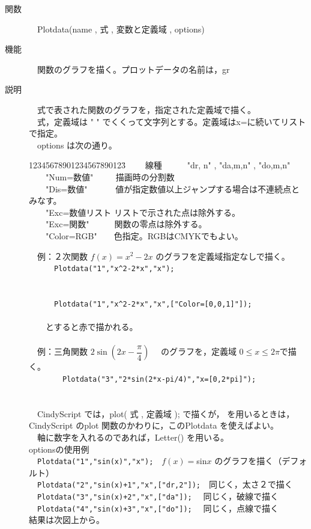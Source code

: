 \documentclass[papersize,a4paper,12pt,uplatex]{jsarticle}
\begin{document}
\begin{description}
\hypertarget{plotdata}{}
\item[関数]　Plotdata(name , 式 , 変数と定義域 , options)
\item[機能]　関数のグラフを描く。プロットデータの名前は，gr
\item[説明]　式で表された関数のグラフを，指定された定義域で描く。\\
　式，定義域は " " でくくって文字列とする。定義域はx=に続いてリストで指定。\\
　options は次の通り。
\begin{tabbing}
12345678901234567890123\=\kill
　　線種　　　\>"dr, n"  , "da,m,n" , "do,m,n"\\
　　"Num=数値" 　　 \>描画時の分割数\\
　　"Dis=数値"　　　 \>値が指定数値以上ジャンプする場合は不連続点とみなす。\\
　　"Exc=数値リスト \>リストで示された点は除外する。\\
　　"Exc=関数"　　　\>関数の零点は除外する。\\
　　"Color=RGB"　　\>色指定。RGBはCMYKでもよい。\\
\end{tabbing}
　例：２次関数 $f(x)=x^2-2x$ のグラフを定義域指定なしで描く。\\
　　　\verb|Plotdata("1","x^2-2*x","x");|\\
　\\
　　
　\\
　　　\verb|Plotdata("1","x^2-2*x","x",["Color=[0,0,1]"]);|\\
　\\
　　とすると赤で描かれる。\\
　\\
　例：三角関数 $2\sin \left(2x-\dfrac{\pi}{4} \right)$ 　のグラフを，定義域 $0 \leq x \leq 2 \pi$で描く。\\
　　　　\verb|Plotdata("3","2*sin(2*x-pi/4)","x=[0,2*pi]");|\\
　\\
　　　　
　\\
　CindyScript では，plot( 式 , 定義域 ); で描くが， \ketcindy  を用いるときは，CindyScript のplot 関数のかわりに，このPlotdata を使えばよい。\\
　軸に数字を入れるのであれば，Letter() を用いる。\\

optionsの使用例\\
　\verb|Plotdata("1","sin(x)","x");|　$f(x)=$sin$x$ のグラフを描く（デフォルト）\\
　\verb|Plotdata("2","sin(x)+1","x",["dr,2"]);|　同じく，太さ２で描く\\
　\verb|Plotdata("3","sin(x)+2","x",["da"]);|　 同じく，破線で描く\\
　\verb|Plotdata("4","sin(x)+3","x",["do"]);|　 同じく，点線で描く\\
結果は次図上から。\\
　\\
　　　　　\\


\end{description}
\end{document}
